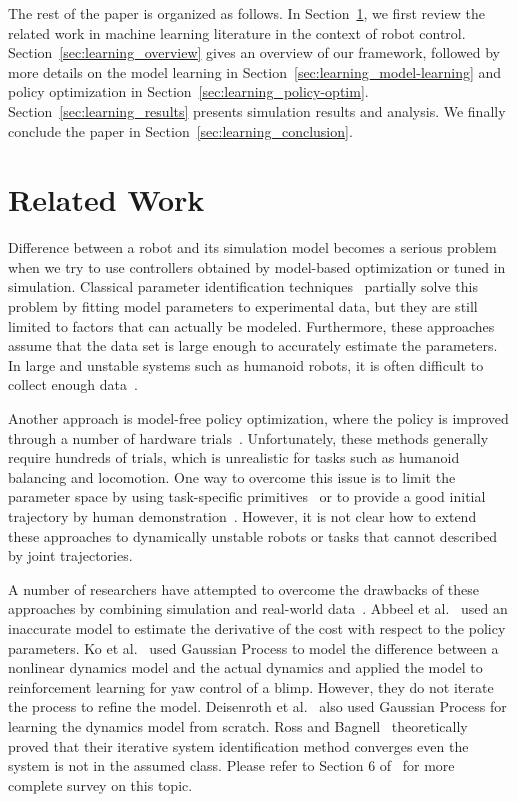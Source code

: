 \documentclass[letterpaper, 10 pt, conference]{ieeeconf}
\begin{document}
The rest of the paper is organized as follows.
In Section~\ref{sec:learning_related}, we first review the related work in
machine learning literature in the context of robot control.
Section~\ref{sec:learning_overview} gives an overview of our framework, followed
by more details on the model learning in
Section~\ref{sec:learning_model-learning} and policy optimization in
Section~\ref{sec:learning_policy-optim}.
Section~\ref{sec:learning_results} presents simulation results and analysis.
We finally conclude the paper in Section~\ref{sec:learning_conclusion}.

\section{Related Work} \label{sec:learning_related}

Difference between a robot and its simulation model becomes a serious
problem when we try to use controllers obtained by model-based
optimization or tuned in simulation.
Classical parameter identification
techniques~\cite{bib-khalil-identification} partially solve this
problem by fitting model parameters to experimental data, but they
are still limited to factors that can actually be modeled. 
Furthermore, these approaches assume that the data set is large enough
to accurately estimate the parameters.
In large and unstable systems such as humanoid robots, it is often
difficult to collect enough data~\cite{bib-humanoids2011-calibration}.

Another approach is model-free policy optimization, where the policy is
improved through a number of hardware trials~\cite{bib-morimoto-standup,bib-kober-primitives}.
Unfortunately, these methods generally require hundreds of
trials, which is unrealistic for tasks such as humanoid balancing and
locomotion.
One way to overcome this issue is to limit the parameter space by using
task-specific primitives~\cite{bib-nakanishi-adaptation} or to provide a
good initial trajectory by human
demonstration~\cite{bib-atkeson-demonstration}.
However, it is not clear how to extend these approaches to dynamically
unstable robots or tasks that cannot described by joint trajectories.

A number of researchers have attempted to overcome the drawbacks of
these approaches by combining simulation and real-world data~\cite{bib-sutton-integrated,bib-moore-prioritized-sweeping,bib-peng-incremental}.
Abbeel et al.~\cite{bib-abbeel-inaccurate} used an inaccurate model to
estimate the derivative of the cost with respect to the policy
parameters.
Ko et al.~\cite{bib-ko-blimp} used Gaussian Process to model the
difference between a nonlinear dynamics model and the actual dynamics
and applied the model to reinforcement learning for yaw control of a
blimp.  However, they do not iterate the process to refine the model.
Deisenroth et al.~\cite{bib-deisenroth-data-efficient} also used
Gaussian Process for learning the dynamics model from scratch.
Ross and Bagnell~\cite{bib-ross-agnostic} theoretically proved that
their iterative system identification method converges even the system
is not in the assumed class.
Please refer to Section 6 of~\cite{bib-kober-survey} for more complete
survey on this topic.
\end{document}
